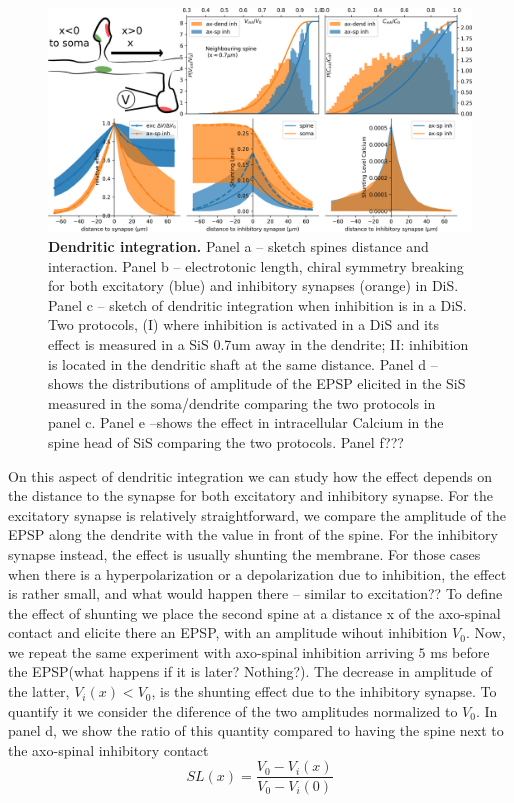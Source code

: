 \documentclass[10pt,letterpaper]{article}
\begin{document}
\begin{figure}[htb!]
\includegraphics[width=1.0\linewidth]{f3}
\caption{{\bf Dendritic integration.}   Panel a -- sketch spines distance and interaction. Panel b -- electrotonic length, chiral symmetry breaking for both excitatory (blue) and inhibitory synapses (orange) in DiS. Panel c -- sketch of dendritic integration when inhibition is in a DiS. Two protocols, (I) where inhibition is activated in a DiS and its effect is measured in a SiS  0.7um away in the dendrite; II: inhibition is located in the dendritic shaft at the same distance. Panel d -- shows the distributions of amplitude of the EPSP elicited in the SiS measured in the soma/dendrite comparing the two protocols in panel c. Panel e --shows the effect in intracellular Calcium in the spine head of SiS comparing the two protocols. Panel f???
}\label{fig:Dendritic integratio}
\end{figure}


On this aspect of dendritic integration we can study how the effect depends on the distance to the synapse for both excitatory and inhibitory synapse. For the excitatory synapse is relatively straightforward, we compare the amplitude of the EPSP along the dendrite with the value in front of the spine. For the inhibitory synapse instead, the effect is usually shunting the membrane. For those cases when there is a hyperpolarization or a depolarization due to inhibition, the effect is rather small, and what would happen there -- similar to excitation?? To define the effect of shunting we place the second spine at a distance x of the axo-spinal contact and elicite there an EPSP, with an amplitude  wihout inhibition $V_0$. Now, we repeat the same experiment with axo-spinal inhibition arriving $5$ ms before the EPSP(what happens if it is later? Nothing?). The decrease in amplitude of the latter, $V_{i}(x)<V_0$, is the shunting effect due to the inhibitory synapse. To quantify it we consider the diference of the two amplitudes normalized to $V_0$. In panel d, we show the ratio of this quantity compared to having the spine next to the axo-spinal inhibitory contact
\[ SL(x) = \frac{V_0-V_i(x)}{V_0-V_i(0)}
\]
\end{document}
